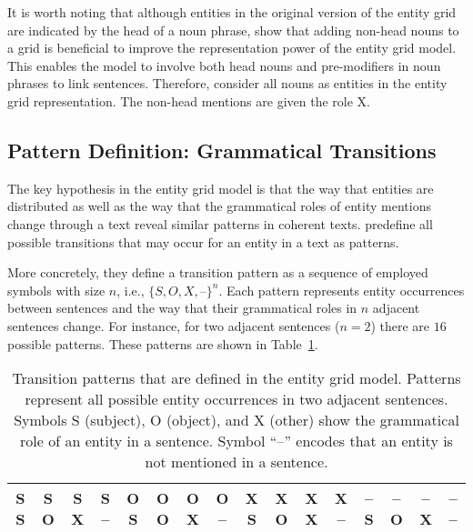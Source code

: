 It is worth noting that although entities in the original version of the entity grid are indicated by the head of a noun phrase, 
 show that adding non-head nouns to a grid is beneficial to improve the representation power of the entity grid model. 
This enables the model to involve both head nouns and pre-modifiers in noun phrases to link sentences. 
Therefore,  consider all nouns as entities in the entity grid representation.  
The non-head mentions are given the role X. 

\subsection{Pattern Definition: Grammatical Transitions}

The key hypothesis in the entity grid model is that the way that entities are distributed as well as the way that the grammatical roles of entity mentions change through a text reveal similar patterns in coherent texts.  
 predefine all possible transitions that may occur for an entity in a text as patterns. 

More concretely, they define a transition pattern as a sequence of employed symbols with size $n$, i.e., $\{ S,O,X,\textit{--} \}^n$. 
Each pattern represents entity occurrences between sentences and the way that their grammatical roles in $n$ adjacent sentences change. 
For instance, for two adjacent sentences ($n=2$) there are $16$ possible patterns.
These patterns are shown in Table~\ref{table:rel-egrid-pattern}. 

\begin{table}[!ht]
	\begin{center}
		\resizebox{\columnwidth}{!}
		{%
			\begin{tabular}{@{}cccccccccccccccc@{}}
			\toprule
			S S & S O & S X & S -- & 
			O S & O O & O X & O -- & 
			X S & X O & X X & X -- & 
			-- S & -- O & -- X & -- -- 
			\\
			\bottomrule	
			\end{tabular}
		}%
	\end{center}
	\caption{
	Transition patterns that are defined in the entity grid model.  
	Patterns represent all possible entity occurrences in two adjacent sentences. 
	Symbols S (subject), O (object), and X (other) show the grammatical role of an entity in a sentence. Symbol ``--'' encodes that an entity is not mentioned in a sentence.
	}
	\label{table:rel-egrid-pattern}
\end{table}

